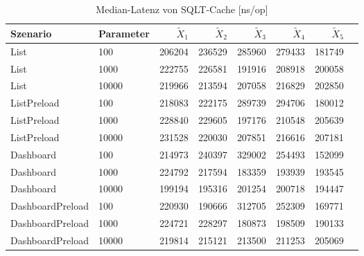 
\begin{table}[ht]
\setlength{\extrarowheight}{-1pt}
\centering
\caption{Median-Latenz von SQLT-Cache [ns/op]}
\begin{tabular}{llrrrrrr}
\toprule
Szenario & Parameter & ${\tilde{X}_1}$ & ${\tilde{X}_2}$ & ${\tilde{X}_3}$ & ${\tilde{X}_4}$ & ${\tilde{X}_5}$ \\
\midrule
	List & 100 & 206204 & 236529 & 285960 & 279433 & 181749 \\
	List & 1000 & 222755 & 226581 & 191916 & 208918 & 200058 \\
	List & 10000 & 219966 & 213594 & 207058 & 216829 & 202850 \\
	ListPreload & 100 & 218083 & 222175 & 289739 & 294706 & 180012 \\
	ListPreload & 1000 & 228840 & 229605 & 197176 & 210548 & 205639 \\
	ListPreload & 10000 & 231528 & 220030 & 207851 & 216616 & 207181 \\
	Dashboard & 100 & 214973 & 240397 & 329002 & 254493 & 152099 \\
	Dashboard & 1000 & 224792 & 217594 & 183359 & 193939 & 193545 \\
	Dashboard & 10000 & 199194 & 195316 & 201254 & 200718 & 194447 \\
	DashboardPreload & 100 & 220930 & 190666 & 312705 & 252309 & 169771 \\
	DashboardPreload & 1000 & 224721 & 228297 & 180873 & 198509 & 190133 \\
	DashboardPreload & 10000 & 219814 & 215121 & 213500 & 211253 & 205069 \\
\bottomrule
\end{tabular}
\label{tab:durchsatz_sqltcache}
\end{table}
	
